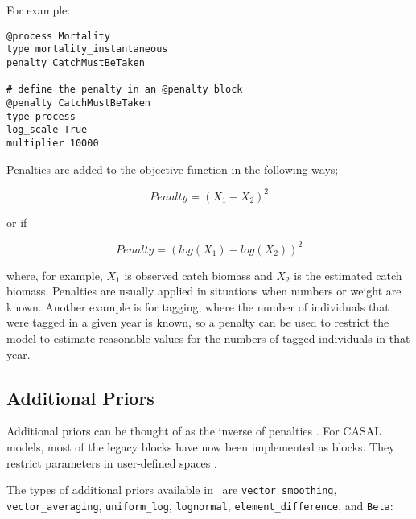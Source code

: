 For example:

{\small{\begin{verbatim}
@process Mortality
type mortality_instantaneous
penalty CatchMustBeTaken

# define the penalty in an @penalty block
@penalty CatchMustBeTaken
type process
log_scale True
multiplier 10000
\end{verbatim}}}

Penalties are added to the objective function in the following ways;

\begin{equation}
	Penalty = (X_1 - X_2)^2
\end{equation}

or if 

\begin{equation}
Penalty = (log(X_1) - log(X_2))^2
\end{equation}

where, for example, $X_1$ is observed catch biomass and $X_2$ is the estimated catch biomass. Penalties are usually applied in situations when numbers or weight are known. Another example is for tagging, where the number of individuals that were tagged in a given year is known, so a penalty can be used to restrict the model to estimate reasonable values for the numbers of tagged individuals in that year.

\subsection{Additional Priors\label{sec:AdditionalPriors}}

Additional priors can be thought of as the inverse of penalties . For CASAL models, most of the legacy  blocks have now been implemented as  blocks. They restrict parameters in user-defined spaces .

The types of additional priors available in \CNAME\ are \texttt{vector\_smoothing}, \texttt{vector\_averaging}, \texttt{uniform\_log}, \texttt{lognormal}, \texttt{element\_difference}, and \texttt{Beta}:

